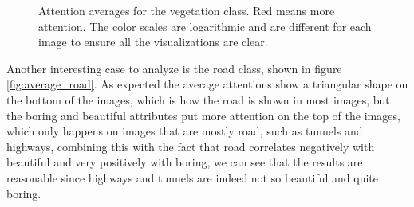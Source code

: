 \begin{figure}[ht]
{	}
	\caption[Vegetation attention averages]{
		Attention averages for the vegetation class. Red means more attention. The color
		scales are logarithmic and are different for each image to ensure all the visualizations
		are clear.
		}
\end{figure}
\label{fig:average_vegetations}

Another interesting case to analyze is the road class, shown in figure \ref{fig:average_road}.
As expected the average attentions show a triangular shape on the bottom of the images, which
is how the road is shown in most images, but the boring and beautiful attributes put more attention
on the top of the images, which only happens on images that are mostly road, such as tunnels and
highways, combining this with the fact that road correlates negatively with beautiful and very
positively with boring, we can see that the results are reasonable since highways and tunnels are
indeed not so beautiful and quite boring.

